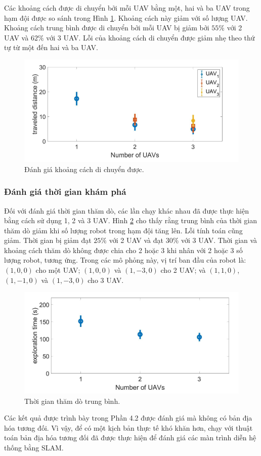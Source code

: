 \documentclass[11pt,openany]{book}
\begin{document}
Các khoảng cách được di chuyển bởi mỗi UAV bằng một, hai và ba UAV trong hạm đội được so sánh trong Hình \ref{fig:3.21}. Khoảng cách này giảm với số lượng UAV. Khoảng cách trung bình được di chuyển bởi mỗi UAV bị giảm bởi $55\%$ với 2 UAV và $62\%$ với 3 UAV. Lỗi của khoảng cách di chuyển được giảm nhẹ theo thứ tự từ một đến hai và ba UAV.
\begin{figure}[H]
    \centering
    \includegraphics[scale=0.4]{assets/3_21.png}
    \caption{Đánh giá khoảng cách di chuyển được.}
    \label{fig:3.21}
\end{figure}
\subsubsection{Đánh giá thời gian khám phá}
Đối với đánh giá thời gian thăm dò, các lần chạy khác nhau đã được thực hiện bằng cách sử dụng 1, 2 và 3 UAV. Hình \ref{fig:3.22} cho thấy rằng trung bình của thời gian thăm dò giảm khi số lượng robot trong hạm đội tăng lên. Lỗi tính toán cũng giảm. Thời gian bị giảm đạt $25\%$ với 2 UAV và đạt $30\%$ với 3 UAV. Thời gian và khoảng cách thăm dò không được chia cho 2 hoặc 3 khi nhân với 2 hoặc 3 số lượng robot, tương ứng. Trong các mô phỏng này, vị trí ban đầu của robot là: $(1,0,0)$ cho một UAV; $(1,0,0)$ và $(1,-3,0)$ cho 2 UAV; và $(1,1,0)$, $(1,-1,0)$ và $(1,-3,0)$ cho 3 UAV.
\begin{figure}[H]
    \centering
    \includegraphics[scale=0.4]{assets/3_22.png}
    \caption{Thời gian thăm dò trung bình.}
    \label{fig:3.22}
\end{figure}
Các kết quả được trình bày trong Phần 4.2 được đánh giá mà không có bản địa hóa tương đối. Vì vậy, để có một kịch bản thực tế khó khăn hơn, chạy với thuật toán bản địa hóa tương đối đã được thực hiện để đánh giá các màn trình diễn hệ thống bằng SLAM.
\end{document}
